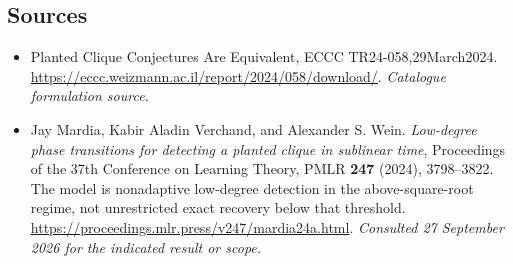 \documentclass[11pt,a4paper]{article}
\numberwithin{equation}{section}
\begin{document}
\subsection{Sources}
\begin{itemize}\raggedright
\item[\textnormal{[S1]}]\hypertarget{source:132:1}{} Planted Clique Conjectures Are Equivalent, ECCC TR24-058,29March2024.
\url{https://eccc.weizmann.ac.il/report/2024/058/download/}.
{\small\textit{Catalogue formulation source.}}
\item[\textnormal{[E1]}]\hypertarget{extra:132:1}{} Jay Mardia, Kabir Aladin Verchand, and Alexander S. Wein.
\emph{Low-degree phase transitions for detecting a planted clique in sublinear time}, Proceedings of the 37th Conference on Learning Theory, PMLR \textbf{247} (2024), 3798--3822. The model is nonadaptive low-degree detection in the above-square-root regime, not unrestricted exact recovery below that threshold.
\url{https://proceedings.mlr.press/v247/mardia24a.html}.
{\small\textit{Consulted 27 September 2026 for the indicated result or scope.}}
\end{itemize}
\end{document}
